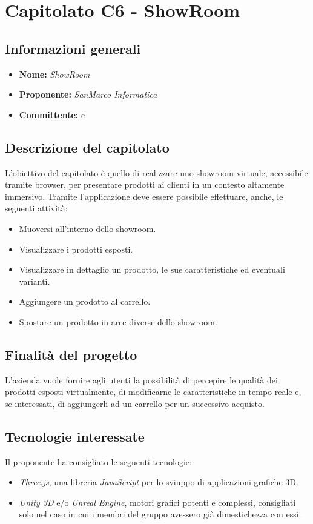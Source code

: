 \section{Capitolato C6 - ShowRoom }\label{section:c6}

\subsection{Informazioni generali}
\begin{itemize}
    \item \textbf{Nome:} \textit{ShowRoom}
    \item \textbf{Proponente:} \textit{SanMarco Informatica}
    \item \textbf{Committente:} \commitNameM{} e \commitNameS{}
\end{itemize}

\subsection{Descrizione del capitolato}
L'obiettivo del capitolato è quello di realizzare uno showroom virtuale, accessibile tramite browser, per presentare prodotti ai clienti in un contesto altamente immersivo.
Tramite l'applicazione deve essere possibile effettuare, anche, le seguenti attività:
\begin{itemize}
    \item Muoversi all'interno dello showroom.
    \item Visualizzare i prodotti esposti.
    \item Visualizzare in dettaglio un prodotto, le sue caratteristiche ed eventuali varianti.
    \item Aggiungere un prodotto al carrello.
    \item Spostare un prodotto in aree diverse dello showroom.
\end{itemize}

\subsection{Finalità del progetto}
L’azienda vuole fornire agli utenti la possibilità di percepire le qualità dei prodotti esposti virtualmente,
di modificarne le caratteristiche in tempo reale e, se interessati, di aggiungerli ad un carrello per un
successivo acquisto.

\subsection{Tecnologie interessate}
Il proponente ha consigliato le seguenti tecnologie:
\begin{itemize}
    \item \textit{Three.js}, una libreria \textit{JavaScript} per lo sviuppo di applicazioni grafiche 3D.
    \item \textit{Unity 3D} e/o \textit{Unreal Engine}, motori grafici potenti e complessi, consigliati solo nel caso in cui i membri del gruppo avessero già dimestichezza con essi.
\end{itemize}

